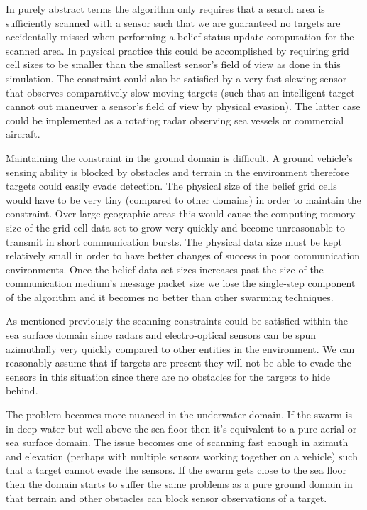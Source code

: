 In purely abstract terms the algorithm only requires that a search area is sufficiently scanned with a sensor such that we are guaranteed no targets are accidentally missed when performing a belief status update computation for the scanned area. In physical practice this could be accomplished by requiring grid cell sizes to be smaller than the smallest sensor's field of view as done in this simulation.  The constraint could also be satisfied by a very fast slewing sensor that observes comparatively slow moving targets (such that an intelligent target cannot out maneuver a sensor's field of view by physical evasion).  The latter case could be implemented as a rotating radar observing sea vessels or commercial aircraft.

Maintaining the constraint in the ground domain is difficult.  A ground vehicle's sensing ability is blocked by obstacles and terrain in the environment therefore targets could easily evade detection.  The physical size of the belief grid cells would have to be very tiny (compared to other domains) in order to maintain the constraint.  Over large geographic areas this would cause the computing memory size of the grid cell data set to grow very quickly and become unreasonable to transmit in short communication bursts.  The physical data size must be kept relatively small in order to have better changes of success in poor communication environments.  Once the belief data set sizes increases past the size of the communication medium's message packet size we lose the single-step component of the algorithm and it becomes no better than other swarming techniques.

As mentioned previously the scanning constraints could be satisfied within the sea surface domain since radars and electro-optical sensors can be spun azimuthally very quickly compared to other entities in the environment.  We can reasonably assume that if targets are present they will not be able to evade the sensors in this situation since there are no obstacles for the targets to hide behind.  

The problem becomes more nuanced in the underwater domain.  If the swarm is in deep water but well above the sea floor then it's equivalent to a pure aerial or sea surface domain.  The issue becomes one of scanning fast enough in azimuth and elevation (perhaps with multiple sensors working together on a vehicle) such that a target cannot evade the sensors.  If the swarm gets close to the sea floor then the domain starts to suffer the same problems as a pure ground domain in that terrain and other obstacles can block sensor observations of a target.
